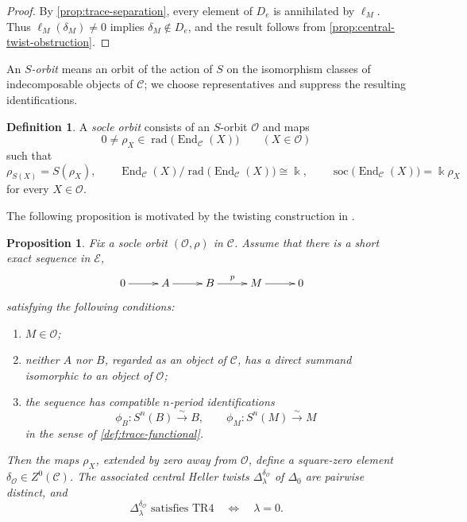 \documentclass[a4paper,11pt,reqno]{amsart}
\newtheorem{proposition}[proposition]{Proposition}
\theoremstyle{definition}
\newtheorem{definition}[definition]{Definition}
\theoremstyle{plain}
\numberwithin{equation}{section}
\newcommand{\C}{\mathcal C}
\newcommand{\End}{\operatorname{End}}
\newcommand{\kk}{\Bbbk}
\begin{document}
\begin{proof}
By \cref{prop:trace-separation}, every element of \(D_e\) is annihilated by
\(\ell_M\).  Thus \(\ell_M(\delta_M)\ne0\) implies
\(\delta_M\notin D_e\), and the result follows from
\cref{prop:central-twist-obstruction}.
\end{proof}

An \emph{\(S\)-orbit} means an orbit of the action of \(S\) on the
isomorphism classes of indecomposable objects of \(\C\); we choose
representatives and suppress the resulting identifications.

\begin{definition}
\label{def:periodic-socle-orbit}
A \emph{socle orbit} consists of an \(S\)-orbit
\(\mathcal O\) and maps
\[
 0\ne\rho_X\in\operatorname{rad}\bigl(\End_{\C}(X)\bigr)
 \qquad(X\in\mathcal O)
\]
such that
\[
 \rho_{S(X)}=S(\rho_X),\qquad
 \End_{\C}(X)/
 \operatorname{rad}\bigl(\End_{\C}(X)\bigr)\cong\kk,\qquad
 \operatorname{soc}\bigl(\End_{\C}(X)\bigr)=\kk\rho_X
\]
for every \(X\in\mathcal O\).
\end{definition}

\pagebreak[3]
The following proposition is motivated by the twisting construction in
\cite[Section~3.2]{ChenLiuLuZhang2026}.

\begin{proposition}
\label{prop:periodic-orbit-detector}
Fix a socle orbit \((\mathcal O,\rho)\) in \(\C\).  Assume that there is a
short exact sequence in \(\mathcal E\),
\begin{equation*}
	\xymatrix@C=2.2pc{
		\quad0\ar[r]&A\ar[r]&B\ar[r]^-{p}&M\ar[r]&0
	}
\end{equation*}
satisfying the following conditions:
\begin{enumerate}[label=\textup{(\arabic*)}]
\item \(M\in\mathcal O\);
\item neither \(A\) nor \(B\), regarded as an object of \(\C\), has a
 direct summand isomorphic to an object of \(\mathcal O\);
\item the sequence has compatible \(n\)-period identifications
\[
 \phi_B:S^n(B)\xrightarrow{\sim}B,
 \qquad
 \phi_M:S^n(M)\xrightarrow{\sim}M
\]
in the sense of \cref{def:trace-functional}.
\end{enumerate}
Then the maps \(\rho_X\), extended by zero away from \(\mathcal O\),
define a square-zero element
\(\delta_{\mathcal O}\in Z^0(\C)\).  The associated central Heller twists
\(\Delta_\lambda^{\delta_{\mathcal O}}\) of \(\Delta_0\) are pairwise
distinct, and
\[
 \Delta_\lambda^{\delta_{\mathcal O}}
 \text{ satisfies }\mathrm{TR4}
 \quad\Longleftrightarrow\quad
 \lambda=0.
\]
\end{proposition}
\end{document}

